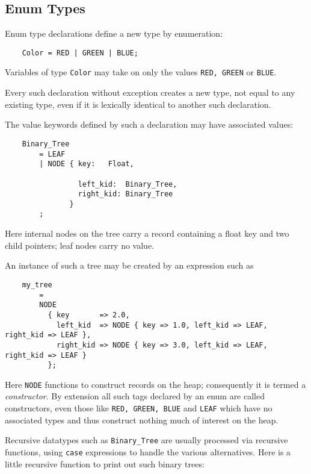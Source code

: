 \cutend*



\subsection{Enum Types}
\label{section:ref:types:enum-types}

Enum type declarations define a new type by enumeration:

\begin{verbatim}
    Color = RED | GREEN | BLUE;
\end{verbatim}

Variables of type {\tt Color} may take on only the values 
{\tt RED, GREEN} or {\tt BLUE}.

Every such declaration without exception creates a new 
type, not equal to any existing type, even if it is 
lexically identical to another such declaration.

The value keywords defined by such a declaration may have 
associated values:

\begin{verbatim}
    Binary_Tree
        = LEAF
        | NODE { key:   Float,

                 left_kid:  Binary_Tree,
                 right_kid: Binary_Tree
               }
        ;
\end{verbatim}

Here internal nodes on the tree carry a record  
containing a float key and two child pointers;  leaf nodes carry no value.

An instance of such a tree may be created by an expression such as

\begin{verbatim}
    my_tree
        =
        NODE
          { key       => 2.0,
            left_kid  => NODE { key => 1.0, left_kid => LEAF, right_kid => LEAF },
            right_kid => NODE { key => 3.0, left_kid => LEAF, right_kid => LEAF }
          };
\end{verbatim}

Here {\tt NODE} functions to construct records on the heap; 
consequently it is termed a {\it constructor}.  By extension 
all such tags declared by an enum are called constructors, 
even those like {\tt RED, GREEN, BLUE} and {\tt LEAF} which 
have no associated types and thus construct nothing much of 
interest on the heap.

Recursive datatypes such as {\tt Binary\_Tree} are usually 
processed via recursive functions, using {\tt case} expressions 
to handle the various alternatives.  Here is a little 
recursive function to print out such binary trees: 

